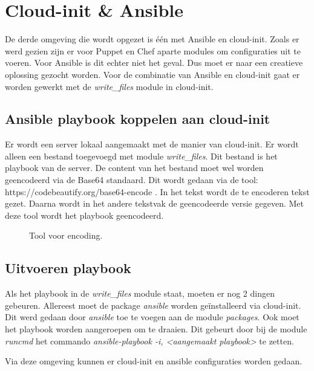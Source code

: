 \section{Cloud-init \& Ansible }
De derde omgeving die wordt opgezet is één met Ansible en cloud-init. Zoals er werd gezien zijn er voor Puppet en Chef aparte modules om configuraties uit te voeren. Voor Ansible is dit echter niet het geval. Dus moet er naar een creatieve oplossing gezocht worden. Voor de combinatie van Ansible en cloud-init gaat er worden gewerkt met de \textit{write\_files} module in cloud-init. 

\subsection{Ansible playbook koppelen aan cloud-init}
Er wordt een server lokaal aangemaakt met de manier van cloud-init. Er wordt alleen een bestand toegevoegd met module \textit{write\_files}. Dit bestand is het playbook van de server. De content van het bestand moet wel worden geencodeerd via de Base64 standaard. Dit wordt gedaan via de tool: https://codebeautify.org/base64-encode . In het tekst wordt de te encoderen tekst gezet. Daarna wordt in het andere tekstvak de geencodeerde versie gegeven. Met deze tool wordt het playbook geencodeerd.
\begin{figure}[!htb]
    \caption{Tool voor encoding.}
    \label{fig:base64}
\end{figure}

\newpage
\subsection{Uitvoeren playbook}
Als het playbook in de \textit{write\_files} module staat, moeten er nog 2 dingen gebeuren. Allereest moet de package \textit{ansible} worden geïnstalleerd via cloud-init. Dit werd gedaan door \textit{ansible} toe te voegen aan de module \textit{packages}. Ook moet het playbook worden aangeroepen om te draaien. Dit gebeurt door bij de module \textit{runcmd} het commando \textit{ansible-playbook -i, <aangemaakt playbook>} te zetten.

Via deze omgeving kunnen er cloud-init en ansible configuraties worden gedaan.



